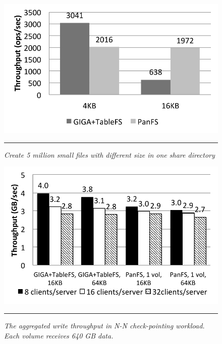 \begin{figure}[t]  %
\centerline{\includegraphics[scale=0.5]{./figs/small_file_creates}}
\vspace{10pt}
\caption{\normalsize
\textit{Create 5 million small files with different size
in one share directory}
}
\vspace{10pt}
\hrule
\label{graph:ldb-singlenode}
\end{figure}       %

\begin{figure}[t]  %
\centerline{\includegraphics[scale=0.6]{./figs/checkpointing_write}}
\vspace{10pt}
\caption{\normalsize
\textit{
The aggregated write throughput in N-N check-pointing workload.
Each volume receives 640 GB data.
}
}
\vspace{10pt}
\hrule
\label{graph:ldb-singlenode}
\end{figure}       %

